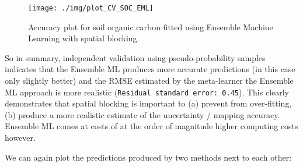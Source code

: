 \documentclass[
  graybox,natbib,nospthms]{svmono}
\newenvironment{Shaded}{\begin{snugshade}}{\end{snugshade}}
\newcommand{\AttributeTok}[1]{\textcolor[rgb]{0.61,0.61,0.61}{#1}}
\newcommand{\DecValTok}[1]{\textcolor[rgb]{0.06,0.06,0.06}{#1}}
\newcommand{\FloatTok}[1]{\textcolor[rgb]{0.06,0.06,0.06}{#1}}
\newcommand{\FunctionTok}[1]{\textcolor[rgb]{0,0,0}{#1}}
\newcommand{\NormalTok}[1]{#1}
\newcommand{\OtherTok}[1]{\textcolor[rgb]{0.37,0.37,0.37}{#1}}
\newcommand{\SpecialCharTok}[1]{\textcolor[rgb]{0,0,0}{#1}}
\newcommand{\StringTok}[1]{\textcolor[rgb]{0.5,0.5,0.5}{#1}}
\begin{document}
\begin{figure}

{\centering \texttt{[image: ./img/plot\_CV\_SOC\_EML]} 

}

\caption{Accuracy plot for soil organic carbon fitted using Ensemble Machine Learning with spatial blocking.}\label{fig:ac-soc2}
\end{figure}

So in summary, independent validation using pseudo-probability samples indicates
that the Ensemble ML produces more accurate predictions (in this case only slightly
better) and the RMSE estimated by the meta-learner the Ensemble ML approach is more
realistic (\texttt{Residual\ standard\ error:\ 0.45}). This clearly demonstrates that spatial
blocking is important to (a) prevent from over-fitting, (b) produce a more realistic
estimate of the uncertainty / mapping accuracy. Ensemble ML comes at costs of
at the order of magnitude higher computing costs however.

We can again plot the predictions produced by two methods next to each other:

\begin{Shaded}
\end{Shaded}

\begin{Shaded}
\end{Shaded}
\end{document}
